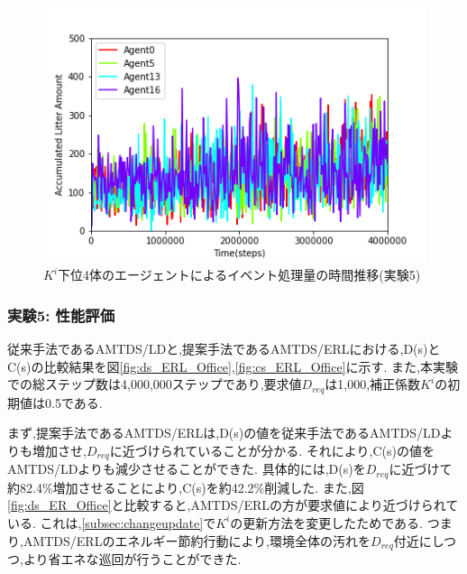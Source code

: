 \documentclass[12pt,a4j,twoside]{jarticle}
\begin{document}
  \begin{figure}
    \centering
    \includegraphics[width=150mm]{figures/al_graph_ERL_Office_worst.png}
    \caption{$K^i$下位4体のエージェントによるイベント処理量の時間推移(実験5)}
    \label{fig:al_ERL_Office_worst}
  \end{figure}

  \subsubsection{実験5: 性能評価}
  \label{ex:ERL1}
  従来手法であるAMTDS/LDと,提案手法であるAMTDS/ERLにおける,D(s)とC(s)の比較結果を図\ref{fig:ds_ERL_Office},\ref{fig:cs_ERL_Office}に示す.
  また,本実験での総ステップ数は4,000,000ステップであり,要求値$D_{req}$は1,000,補正係数$K^i$の初期値は0.5である.

  \par
  まず,提案手法であるAMTDS/ERLは,D(s)の値を従来手法であるAMTDS/LDよりも増加させ,$D_{req}$に近づけられていることが分かる.
  それにより,C(s)の値をAMTDS/LDよりも減少させることができた.
  具体的には,D(s)を$D_{req}$に近づけて約82.4\%増加させることにより,C(s)を約42.2\%削減した.
  また,図\ref{fig:ds_ER_Office}と比較すると,AMTDS/ERLの方が要求値により近づけられている.
  これは,\ref{subsec:changeupdate}で$K^i$の更新方法を変更したためである.
  つまり,AMTDS/ERLのエネルギー節約行動により,環境全体の汚れを$D_{req}$付近にしつつ,より省エネな巡回が行うことができた.
  
\end{document}
